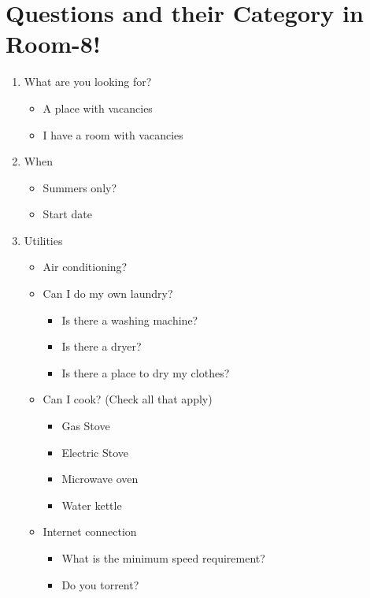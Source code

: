 \documentclass[journal]{./IEEE/IEEEtran}
\begin{document}
\section{Questions and their Category in Room-8!}
\begin{enumerate}

    \item What are you looking for?
    \begin{itemize}
        \item A place with vacancies
        \item I have a room with vacancies
    \end{itemize}

    \item When
    \begin{itemize}
        \item Summers only?
        \item Start date
    \end{itemize}

    \item Utilities
    \begin{itemize}
        \item Air conditioning?
        \item Can I do my own laundry?
        \begin{itemize}
            \item Is there a washing machine?
            \item Is there a dryer?
            \item Is there a place to dry my clothes?
        \end{itemize}
        \item Can I cook? (Check all that apply)
        \begin{itemize}
            \item Gas Stove
            \item Electric Stove
            \item Microwave oven
            \item Water kettle
        \end{itemize}
        \item Internet connection
        \begin{itemize}
            \item What is the minimum speed requirement?
            \item Do you torrent?
        \end{itemize}
    \end{itemize}


\end{enumerate}
\end{document}
